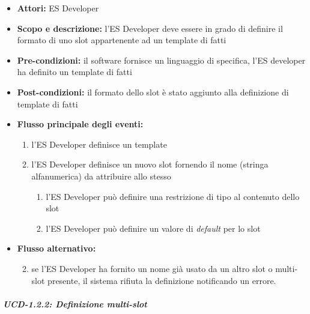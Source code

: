 \begin{itemize}
	\item \textbf{Attori:} ES Developer
	\item \textbf{Scopo e descrizione:} l'ES Developer deve essere in grado di definire il formato di uno slot appartenente ad un template di fatti
	\item \textbf{Pre-condizioni:} il software fornisce un linguaggio di specifica, l'ES developer ha definito un template di fatti
	\item \textbf{Post-condizioni:} il formato dello slot è stato aggiunto alla definizione di template di fatti
	\item \textbf{Flusso principale degli eventi:}
		\begin{enumerate}
			\item l'ES Developer definisce un template
			\item l'ES Developer definisce un nuovo slot fornendo il nome (stringa alfanumerica) da attribuire allo stesso
			\begin{enumerate}
				\item l'ES Developer può definire una restrizione di tipo al contenuto dello slot
				\item l'ES Developer può definire un valore di \emph{default} per lo slot
			\end{enumerate}
		\end{enumerate}
	\item \textbf{Flusso alternativo:} 
		\begin{enumerate}
			\setcounter{enumi}{1}
			\item se l'ES Developer ha fornito un nome già usato da un altro slot o multi-slot presente, il sistema rifiuta la definizione notificando un errore.
		\end{enumerate}
\end{itemize}

\subparagraph{UCD-1.2.2: Definizione multi-slot}

